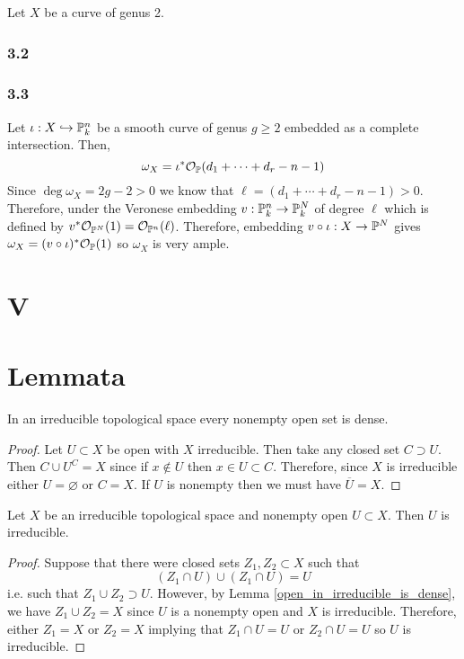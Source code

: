 \documentclass[12pt]{article}
\begin{document}
Let $X$ be a curve of genus 2.

\subsubsection{3.2}

\subsubsection{3.3}

Let $\iota : X \embed \P^n_k$ be a smooth curve of genus $g \ge 2$ embedded as a complete intersection. Then,
\[ \omega_X = \iota^* \struct{\P}(d_1 + \cdots + d_r - n - 1) \]
Since $\deg{\omega_X} = 2 g - 2 > 0$ we know that $\ell = (d_1 + \cdots + d_r - n - 1) > 0$. Therefore, under the Veronese embedding $v : \P^n_k \to \P^N_k$ of degree $\ell$ which is defined by $v^* \struct{\P^{N}}(1) = \struct{\P^n}(\ell)$. Therefore, embedding $v \circ \iota : X \to \P^N$ gives $\omega_X = (v \circ \iota)^* \struct{\P}(1)$ so $\omega_X$ is very ample. 



\section{V}

\section{Lemmata}


\begin{lemma} \label{open_in_irreducible_is_dense}
In an irreducible topological space every nonempty open set is dense.
\end{lemma}

\begin{proof}
Let $U \subset X$ be open with $X$ irreducible. Then take any closed set $C \supset U$. Then $C \cup U^C = X$ since if $x \notin U$ then $x \in U \subset C$. Therefore, since $X$ is irreducible either $U = \varnothing$ or $C = X$. If $U$ is nonempty then we must have $\overline{U} = X$.  
\end{proof}

\begin{lemma} \label{open_of_irreducible}
Let $X$ be an irreducible topological space and nonempty open $U \subset X$. Then $U$ is irreducible.
\end{lemma}

\begin{proof}
Suppose that there were closed sets $Z_1, Z_2 \subset X$ such that
 \[ (Z_1 \cap U) \cup (Z_1 \cap U) = U \]
 i.e. such that $Z_1 \cup Z_2 \supset U$. However, by Lemma \ref{open_in_irreducible_is_dense}, we have $Z_1 \cup Z_2 = X$ since $U$ is a nonempty open and $X$ is irreducible. Therefore, either $Z_1 = X$ or $Z_2 = X$ implying that $Z_1 \cap U = U$ or $Z_2 \cap U = U$ so $U$ is irreducible.   
\end{proof}
\end{document}
